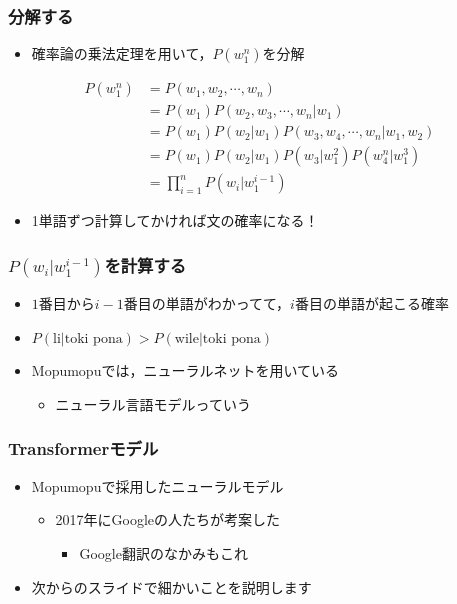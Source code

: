 \documentclass[14pt]{beamer}
\begin{document}
\begin{frame}
	\frametitle{分解する}

	\begin{itemize}
		\item 確率論の乗法定理を用いて，$P(w_1^n)$を分解
	\end{itemize}
	\begin{align*}
		P(w_1^n)
			& = P(w_1, w_2, \cdots, w_n) \\
			& = P(w_1) P(w_2, w_3, \cdots, w_n | w_1) \\
			& = P(w_1) P(w_2 | w_1) P(w_3, w_4, \cdots, w_n | w_1, w_2) \\
			& = P(w_1) P(w_2 | w_1) P(w_3 | w_1^2) P(w_4^n | w_1^3) \\
			& = \prod_{i=1}^{n} P(w_i | w_1^{i-1})
	\end{align*}

	\begin{itemize}
		\item 1単語ずつ計算してかければ文の確率になる！
	\end{itemize}

\end{frame}

\begin{frame}
	\frametitle{$P(w_i | w_1^{i-1})$を計算する}

	\begin{itemize}
		\item $1$番目から$i-1$番目の単語がわかってて，$i$番目の単語が起こる確率
		\item $P(\text{li} | \text{toki pona}) > P(\text{wile} | \text{toki pona})$ 
		\item Mopumopuでは，ニューラルネットを用いている
			\begin{itemize}
				\item ニューラル言語モデルっていう
			\end{itemize}
	\end{itemize}
\end{frame}

\begin{frame}
	\frametitle{Transformerモデル}

	\begin{itemize}
		\item Mopumopuで採用したニューラルモデル
			\begin{itemize}
				\item 2017年にGoogleの人たちが考案した
					\begin{itemize}
						\item Google翻訳のなかみもこれ
					\end{itemize}
			\end{itemize}
		\item 次からのスライドで細かいことを説明します
	\end{itemize}
\end{frame}
\end{document}
